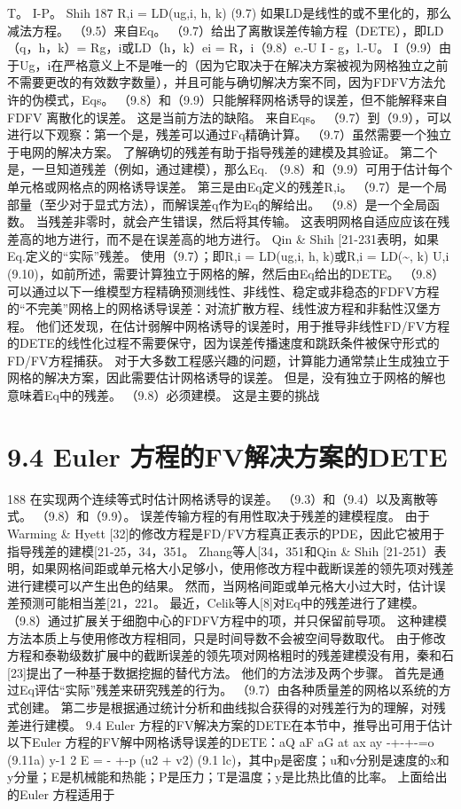 \documentclass[UTF8,11pt,a4paper,openany,fontset=fandol]{ctexbook}
\begin{document}
T。 I-P。 Shih 187 R,i = LD(ug,i, h, k) (9.7) 如果LD是线性的或不里化的，那么减法方程。 （9.5）来自Eq。 （9.7）给出了离散误差传输方程（DETE），即LD（q，h，k）= Rg，i或LD（h，k）ei = R，i（9.8）e.-U I - g，l.-U。 I（9.9）由于Ug，i在严格意义上不是唯一的（因为它取决于在解决方案被视为网格独立之前不需要更改的有效数字数量），并且可能与确切解决方案不同，因为FDFV方法允许的伪模式，Eqs。 （9.8）和（9.9）只能解释网格诱导的误差，但不能解释来自FDFV 离散化的误差。 这是当前方法的缺陷。 来自Eqs。 （9.7）到（9.9），可以进行以下观察：第一个是，残差可以通过Fq精确计算。 （9.7）虽然需要一个独立于电网的解决方案。 了解确切的残差有助于指导残差的建模及其验证。 第二个是，一旦知道残差（例如，通过建模），那么Eq. （9.8）和（9.9）可用于估计每个单元格或网格点的网格诱导误差。 第三是由Eq定义的残差R,i。 （9.7）是一个局部量（至少对于显式方法），而解误差q作为Eq的解给出。 （9.8）是一个全局函数。 当残差非零时，就会产生错误，然后将其传输。 这表明网格自适应应该在残差高的地方进行，而不是在误差高的地方进行。 Qin \& Shih [21-231表明，如果Eq.定义的“实际”残差。 使用（9.7）；即R,i = LD(ug,i, h, k)或R,i = LD(\textasciitilde{}, k) U,i (9.10)，如前所述，需要计算独立于网格的解，然后由Eq给出的DETE。 （9.8）可以通过以下一维模型方程精确预测线性、非线性、稳定或非稳态的FDFV方程的“不完美”网格上的网格诱导误差：对流扩散方程、线性波方程和非黏性汉堡方程。 他们还发现，在估计弱解中网格诱导的误差时，用于推导非线性FD/FV方程的DETE的线性化过程不需要保守，因为误差传播速度和跳跃条件被保守形式的FD/FV方程捕获。 对于大多数工程感兴趣的问题，计算能力通常禁止生成独立于网格的解决方案，因此需要估计网格诱导的误差。 但是，没有独立于网格的解也意味着Eq中的残差。 （9.8）必须建模。 这是主要的挑战

\section{9.4 Euler 方程的FV解决方案的DETE}
188 在实现两个连续等式时估计网格诱导的误差。 （9.3）和（9.4）以及离散等式。 （9.8）和（9.9）。 误差传输方程的有用性取决于残差的建模程度。 由于Warming \& Hyett [32]的修改方程是FD/FV方程真正表示的PDE，因此它被用于指导残差的建模[21-25，34，351。 Zhang等人[34，351和Qin \& Shih [21-251）表明，如果网格间距或单元格大小足够小，使用修改方程中截断误差的领先项对残差进行建模可以产生出色的结果。 然而，当网格间距或单元格大小过大时，估计误差预测可能相当差[21，221。 最近，Celik等人[8]对Eq中的残差进行了建模。 （9.8）通过扩展关于细胞中心的FDFV方程中的项，并只保留前导项。 这种建模方法本质上与使用修改方程相同，只是时间导数不会被空间导数取代。 由于修改方程和泰勒级数扩展中的截断误差的领先项对网格粗时的残差建模没有用，秦和石[23]提出了一种基于数据挖掘的替代方法。 他们的方法涉及两个步骤。 首先是通过Eq评估“实际”残差来研究残差的行为。 （9.7）由各种质量差的网格以系统的方式创建。 第二步是根据通过统计分析和曲线拟合获得的对残差行为的理解，对残差进行建模。 9.4 Euler 方程的FV解决方案的DETE在本节中，推导出可用于估计以下Euler 方程的FV解中网格诱导误差的DETE：aQ aF aG at ax ay -+-+-=o (9.11a) y-1 2 E = - +-p (u2 + v2) (9.1 lc)，其中p是密度；u和v分别是速度的x和y分量；E是机械能和热能；P是压力；T是温度；y是比热比值的比率。 上面给出的Euler 方程适用于
\end{document}
